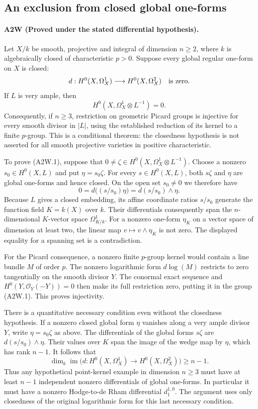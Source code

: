 \subsection{An exclusion from closed global one-forms}
\paragraph{A2W (Proved under the stated differential hypothesis).}
Let $X/k$ be smooth, projective and integral of dimension $n\geq2$,
where $k$ is algebraically closed of characteristic $p>0$.
Suppose every global regular one-form on $X$ is closed:
\[
 d:H^0(X,\Omega_X^1)\longrightarrow H^0(X,\Omega_X^2)
 \quad\hbox{is zero}.
\]
If $L$ is very ample, then
\[
 H^0(X,\Omega_X^1\otimes L^{-1})=0.                 \tag{A2W.1}
\]
Consequently, if $n\geq3$, restriction on geometric Picard
groups is injective for every smooth divisor in $|L|$, using
the established reduction of its kernel to a finite $p$-group.
This is a conditional theorem: the closedness hypothesis is
not asserted for all smooth projective varieties in positive
characteristic.

To prove (A2W.1), suppose that
$0\ne\zeta\in H^0(X,\Omega_X^1\otimes L^{-1})$.
Choose a nonzero $s_0\in H^0(X,L)$ and put $\eta=s_0\zeta$.
For every $s\in H^0(X,L)$, both $s\zeta$ and $\eta$ are
global one-forms and hence closed. On the open set $s_0\ne0$
we therefore have
\[
 0=d\bigl((s/s_0)\eta\bigr)=d(s/s_0)\wedge\eta.
\]
Because $L$ gives a closed embedding, its affine coordinate
ratios $s/s_0$ generate the function field $K=k(X)$ over $k$.
Their differentials consequently span the $n$-dimensional
$K$-vector space $\Omega_{K/k}^1$. For a nonzero one-form
$\eta_K$ on a vector space of dimension at least two, the
linear map $v\mapsto v\wedge\eta_K$ is not zero. The
displayed equality for a spanning set is a contradiction.

For the Picard consequence, a nonzero finite $p$-group kernel
would contain a line bundle $M$ of order $p$. The nonzero
logarithmic form $d\log(M)$ restricts to zero tangentially on
the smooth divisor $Y$. The conormal exact sequence and
$H^0(Y,\mathcal O_Y(-Y))=0$ then make its full restriction
zero, putting it in the group (A2W.1). This proves injectivity.

There is a quantitative necessary condition even without the
closedness hypothesis. If a nonzero closed global form $\eta$
vanishes along a very ample divisor $Y$, write $\eta=s_0\zeta$
as above. The differentials of the global forms $s\zeta$ are
$d(s/s_0)\wedge\eta$. Their values over $K$ span the image
of the wedge map by $\eta$, which has rank $n-1$. It follows
that
\[
 \dim_k\operatorname{im}\bigl(
  d:H^0(X,\Omega_X^1)\to H^0(X,\Omega_X^2)\bigr)
  \geq n-1.                                         \tag{A2W.2}
\]
Thus any hypothetical point-kernel example in dimension
$n\geq3$ must have at least $n-1$ independent nonzero
differentials of global one-forms. In particular it must
have a nonzero Hodge-to-de Rham differential $d_1^{1,0}$.
The argument uses only closedness of the original logarithmic
form for this last necessary condition.
